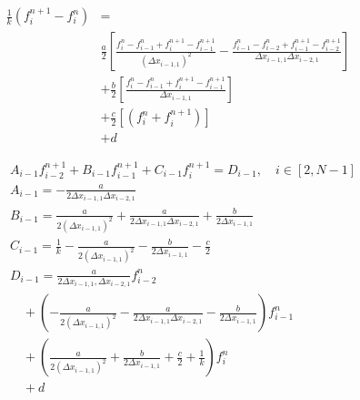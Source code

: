 \documentclass{article}
\begin{document}
    \begin{equation}
        \begin{split}
            \frac{1}{k}\left(f_i^{n+1} - f_i^n\right) &=
            \\
            & \frac{a}{2} \left[
                \frac{f_i^n-f_{i-1}^n + f_i^{n+1}-f_{i-1}^{n+1}}{\left(\Delta x_{i-1,1}\right)^2} -
                            \frac{f_{i-1}^n-f_{i-2}^n + f_{i-1}^{n+1}-f_{i-2}^{n+1}}
                            {\Delta x_{i-1,1} \Delta x_{i-2,1}}
                     \right]
            \\
                 & + \frac{b}{2} \left[ 
                        \frac{f_{i}^n -f_{i-1}^n+f_{i}^{n+1}-f_{i-1}^{n+1}}
                            {\Delta x_{i-1,1}}
                     \right]
            \\
            & + \frac{c}{2} \left[
                    \left( f_i^n + f_i^{n+1} \right)
                     \right]
            \\
            & + d
        \end{split}
    \end{equation}

    \begin{equation}
        \begin{split}
            &A_{i-1} f_{i-2}^{n+1} + B_{i-1} f_{i-1}^{n+1} + C_{i-1} f_{i}^{n+1} = D_{i-1}, \quad i \in [2, N-1]
            \\
            &A_{i-1} =
            -\frac{a}{2\Delta x_{i-1,1} \Delta x_{i-2,1}}
            \\
            &B_{i-1} =
            \frac{a}{2(\Delta x_{i-1,1})^2}
            +\frac{a}{2\Delta x_{i-1,1} \Delta x_{i-2,1}}
            +\frac{b}{2 \Delta x_{i-1,1}}
            \\
            &C_{i-1} =
            \frac{1}{k}
            -\frac{a}{2 (\Delta x_{i-1,1})^2}
            -\frac{b}{2\Delta x_{i-1,1}}
            -\frac{c}{2}
            \\
            &D_{i-1} =
            \frac{a}{2\Delta x_{i-1,1}, \Delta x_{i-2,1}}f_{i-2}^n
            \\
            &\quad +\left(-\frac{a}{2(\Delta x_{i-1,1})^2}
            - \frac{a}{2\Delta x_{i-1,1} \Delta x_{i-2,1}} -\frac{b}{2\Delta x_{i-1,1}}\right) f_{i-1}^n
            \\
            &\quad +\left(\frac{a}{2(\Delta x_{i-1,1})^2} + \frac{b}{2\Delta x_{i-1,1}} + \frac{c}{2}
            +\frac{1}{k}\right) f_i^n
            \\
            &\quad + d \\
        \end{split}
    \end{equation}
\end{document}

